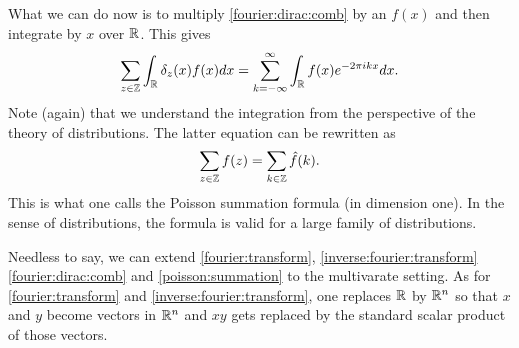 What we can do now is to multiply  \eqref{fourier:dirac:comb} by an $f(x)$ and then integrate by $x$ over $\mathbb{R}$. This gives 
\[
	\sum_{z \in \mathbb{Z}} \int_{\mathbb{R}} \delta_z(x) f(x) d x  = \sum_{k=-\infty}^\infty \int_{\mathbb{R}} f(x) e^{- 2\pi i kx} d x. 
\]
Note (again) that we understand the integration from the perspective of the theory of distributions. The latter equation can be rewritten as 
\begin{equation} \label{poisson:summation} 
	\sum_{z \in \mathbb{Z}} f(z) = \sum_{k \in \mathbb{Z}} \hat{f} (k).  
\end{equation} 
This is what one calls the Poisson summation formula (in dimension one). In the sense of distributions, the formula is valid for a large family of distributions. 

Needless to say, we can extend \eqref{fourier:transform}, \eqref{inverse:fourier:transform} \eqref{fourier:dirac:comb} and \eqref{poisson:summation} to the multivarate setting.  As for \eqref{fourier:transform} and \eqref{inverse:fourier:transform}, one replaces $\mathbb{R}$ by $\mathbb{R}^n$ so that $x$ and $y$ become vectors in $\mathbb{R}^n$ and $x y$ gets replaced by the standard scalar product of those vectors. 

